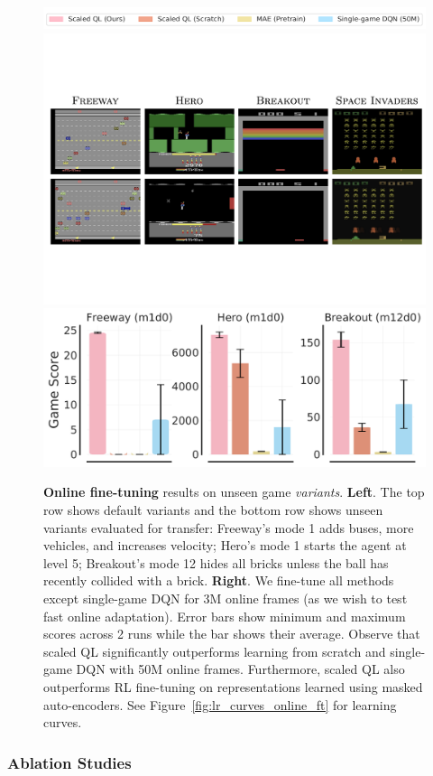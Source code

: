 \begin{figure}[t]
    \centering
        \includegraphics[width=0.9\linewidth]{chapters/scaled_ql/figures/legend_online_ft.pdf}
        \vspace{-0.1cm}
        \includegraphics[width=0.35\linewidth]{chapters/scaled_ql/figures/atari_modes_3games.pdf}
        \includegraphics[width=0.5\linewidth]{chapters/scaled_ql/figures/online_ft_3_games.pdf}
    \vspace{-0.1cm}
    \caption{\footnotesize{\textbf{Online fine-tuning} results on unseen game \emph{variants}. \textbf{Left}. The top row shows default variants and the bottom row shows unseen variants evaluated for transfer: Freeway’s mode 1 adds buses, more vehicles, and increases velocity; Hero’s mode 1 starts the agent at level 5; Breakout’s mode 12 hides all bricks unless the ball has recently collided with a brick. \textbf{Right}. We fine-tune all methods except single-game DQN for 3M online frames (as we wish to test fast online adaptation). Error bars show minimum and maximum scores across 2 runs while the bar shows their average. Observe that scaled QL significantly outperforms learning from scratch and single-game DQN with 50M online frames. Furthermore, scaled QL also outperforms RL fine-tuning on representations learned using masked auto-encoders. See Figure~\ref{fig:lr_curves_online_ft} for learning curves.}}
    \label{fig:online_ft}
    \vspace{-0.5cm}
\end{figure}



\vspace{-0.25cm}
\subsubsection{Ablation Studies}
\label{sec:ablation}
\vspace{-0.25cm}

